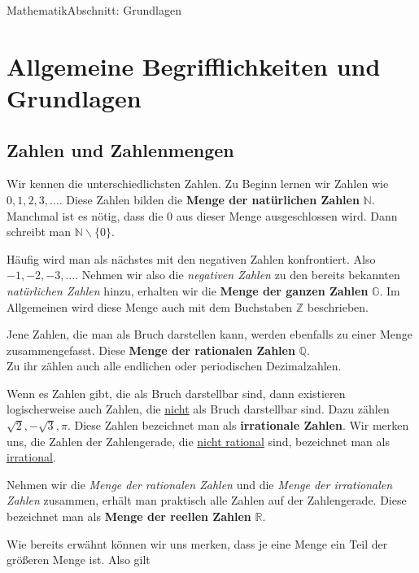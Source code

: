 \documentclass[11pt,twocolumn,oneside,openany,headings=optiontotoc,11pt,numbers=noenddot]{article}
\begin{document}
	\begin{worksheet}{}{Mathematik}{Abschnitt: Grundlagen}
		\section{Allgemeine Begrifflichkeiten und Grundlagen}
		\subsection{Zahlen und Zahlenmengen}
		Wir kennen die unterschiedlichsten Zahlen. Zu Beginn lernen wir Zahlen wie  \(0,1,2,3,\ldots\). Diese Zahlen bilden die \textbf{Menge der natürlichen Zahlen} \(\mathbb{N}\). Manchmal ist es nötig, dass die \(0\) aus dieser Menge ausgeschlossen wird. Dann schreibt man \(\mathbb{N}\backslash\{0\}\).\\
		\par\noindent
		Häufig wird man als nächstes mit den negativen Zahlen konfrontiert. Also \(-1,-2,-3,\ldots\). Nehmen wir also die \textit{negativen Zahlen} zu den bereits bekannten \textit{natürlichen Zahlen} hinzu, erhalten wir die \textbf{Menge der ganzen Zahlen} \(\mathbb{G}\). Im Allgemeinen wird diese Menge auch mit dem Buchstaben \(\mathbb{Z}\) beschrieben.\\
		\par\noindent
		Jene Zahlen, die man als Bruch darstellen kann, werden ebenfalls zu einer Menge zusammengefasst. Diese \textbf{Menge der rationalen Zahlen} \(\mathbb{Q}\).\\
		Zu ihr zählen auch alle endlichen oder periodischen Dezimalzahlen.\\
		\par\noindent
		Wenn es Zahlen gibt, die als Bruch darstellbar sind, dann existieren logischerweise auch Zahlen, die \underline{nicht} als Bruch darstellbar sind. Dazu zählen \(\sqrt{2}, -\sqrt{3}, \pi \). Diese Zahlen bezeichnet man als \textbf{irrationale Zahlen}. Wir merken uns, die Zahlen der Zahlengerade, die \underline{nicht rational} sind, bezeichnet man als \underline{irrational}.\\
		\par\noindent
		Nehmen wir die \textit{Menge der rationalen Zahlen} und die \textit{Menge der irrationalen Zahlen} zusammen, erhält man praktisch alle Zahlen auf der Zahlengerade. Diese bezeichnet man als \textbf{Menge der reellen Zahlen} \(\mathbb{R}\).\\
		\par\noindent
		Wie bereits erwähnt können wir uns merken, dass je eine Menge ein Teil der größeren Menge ist. Also gilt

\end{worksheet}
\end{document}
